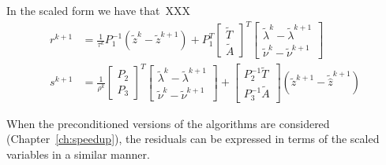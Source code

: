 \documentclass[openany]{now}
\begin{document}
In the scaled form we have that~XXX
 \begin{align}
 r^{k+1} &= \frac{1}{\tau^k}P_1^{-1}(\tilde{z}^k-\tilde{z}^{k+1}) + P_1^T\left[\begin{array}{c}\tilde{T}\\\tilde{A}\end{array}\right]^T\left[\begin{array}{c}\tilde{\lambda}^k-\tilde{\lambda}^{k+1}\\\tilde{\nu}^k-\tilde{\nu}^{k+1}\end{array}\right] \\
 s^{k+1} &= \frac{1}{\rho^k}\left[\begin{array}{c}P_2\\P_3\end{array}\right]^T\left[\begin{array}{c}\tilde{\lambda}^k-\tilde{\lambda}^{k+1}\\\tilde{\nu}^k-\tilde{\nu}^{k+1}\end{array}\right] + \left[\begin{array}{c}P_2^{-1}\tilde{T}\\P_3^{-1}\tilde{A}\end{array}\right](\tilde{z}^{k+1}-\tilde{\hat{z}}^{k+1})
\end{align}
\fi

\remark When the preconditioned versions of the algorithms are considered (Chapter~\ref{ch:speedup}), the residuals can be expressed in terms of the scaled variables in a similar manner.



\backmatter



\end{document}
